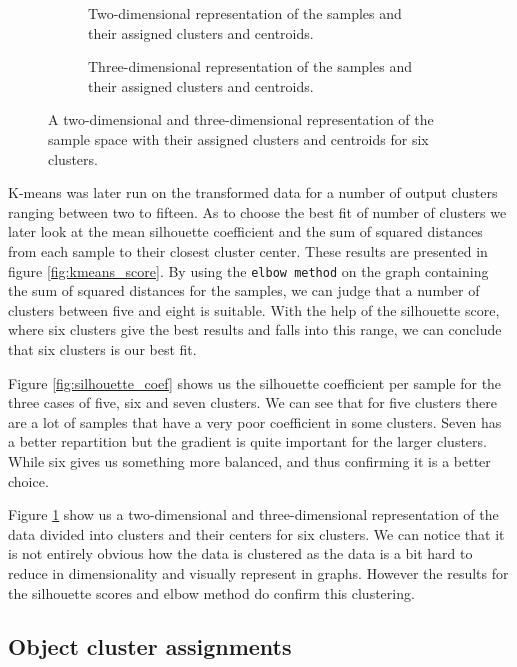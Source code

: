 \begin{figure}
	\begin{subfigure}[b]{\textwidth}
		
		\caption{Two-dimensional representation of the samples and their assigned clusters and centroids.}
	\end{subfigure}
	\begin{subfigure}[b]{\textwidth}
		
		\caption{Three-dimensional representation of the samples and their assigned clusters and centroids.}
	\end{subfigure}
	\caption{A two-dimensional and three-dimensional representation of the sample space with their assigned clusters and centroids for six clusters.}
	\label{fig:clusters}
\end{figure}

K-means was later run on the transformed data for a number of output clusters ranging between two to fifteen. As to choose the best fit of number of clusters we later look at the mean silhouette coefficient and the sum of squared distances from each sample to their closest cluster center. These results are presented in figure \ref{fig:kmeans_score}. By using the \texttt{elbow method} on the graph containing the sum of squared distances for the samples, we can judge that a number of clusters between five and eight is suitable. With the help of the silhouette score, where six clusters give the best results and falls into this range, we can conclude that six clusters is our best fit.

Figure \ref{fig:silhouette_coef} shows us the silhouette coefficient per sample for the three cases of five, six and seven clusters. We can see that for five clusters there are a lot of samples that have a very poor coefficient in some clusters. Seven has a better repartition but the gradient is quite important for the larger clusters. While six gives us something more balanced, and thus confirming it is a better choice.

Figure \ref{fig:clusters} show us a two-dimensional and three-dimensional representation of the data divided into clusters and their centers for six clusters. We can notice that it is not entirely obvious how the data is clustered as the data is a bit hard to reduce in dimensionality and visually represent in graphs. However the results for the silhouette scores and elbow method do confirm this clustering.


\subsection{Object cluster assignments}

